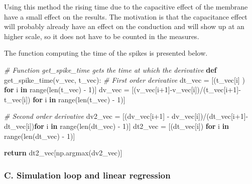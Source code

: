 \documentclass[]{article}
\newenvironment{Shaded}{}{}
\newcommand{\BuiltInTok}[1]{#1}
\newcommand{\CommentTok}[1]{\textcolor[rgb]{0.38,0.63,0.69}{\textit{#1}}}
\newcommand{\ControlFlowTok}[1]{\textcolor[rgb]{0.00,0.44,0.13}{\textbf{#1}}}
\newcommand{\DecValTok}[1]{\textcolor[rgb]{0.25,0.63,0.44}{#1}}
\newcommand{\KeywordTok}[1]{\textcolor[rgb]{0.00,0.44,0.13}{\textbf{#1}}}
\newcommand{\NormalTok}[1]{#1}
\newcommand{\OperatorTok}[1]{\textcolor[rgb]{0.40,0.40,0.40}{#1}}
\begin{document}
Using this method the rising time due to the capacitive effect of the
membrane have a small effect on the results. The motivation is that the
capacitance effect will probably already have an effect on the
conduction and will show up at an higher scale, so it does not have to
be counted in the measures.

The function computing the time of the spikes is presented below.

\begin{Shaded}
\begin{Highlighting}[]
\CommentTok{# Function get_spike_time gets the time at which the derivative  }
\KeywordTok{def}\NormalTok{ get_spike_time(v_vec, t_vec):}
    \CommentTok{# First order derivative}
\NormalTok{    dt_vec }\OperatorTok{=}\NormalTok{ [(t_vec[i] ) }\ControlFlowTok{for}\NormalTok{ i }\KeywordTok{in} \BuiltInTok{range}\NormalTok{(}\BuiltInTok{len}\NormalTok{(t_vec) }\OperatorTok{-} \DecValTok{1}\NormalTok{)]}
\NormalTok{    dv_vec }\OperatorTok{=}\NormalTok{ [(v_vec[i}\OperatorTok{+}\DecValTok{1}\NormalTok{]}\OperatorTok{-}\NormalTok{v_vec[i])}\OperatorTok{/}\NormalTok{(t_vec[i}\OperatorTok{+}\DecValTok{1}\NormalTok{]}\OperatorTok{-}\NormalTok{t_vec[i]) }\ControlFlowTok{for}\NormalTok{ i }\KeywordTok{in} \BuiltInTok{range}\NormalTok{(}\BuiltInTok{len}\NormalTok{(t_vec) }\OperatorTok{-} \DecValTok{1}\NormalTok{)]}

    \CommentTok{# Second order derivative}
\NormalTok{    dv2_vec }\OperatorTok{=}\NormalTok{ [(dv_vec[i}\OperatorTok{+}\DecValTok{1}\NormalTok{] }\OperatorTok{-}\NormalTok{ dv_vec[i])}\OperatorTok{/}\NormalTok{(dt_vec[i}\OperatorTok{+}\DecValTok{1}\NormalTok{]}\OperatorTok{-}\NormalTok{dt_vec[i])}\ControlFlowTok{for}\NormalTok{ i }\KeywordTok{in} \BuiltInTok{range}\NormalTok{(}\BuiltInTok{len}\NormalTok{(dt_vec) }\OperatorTok{-} \DecValTok{1}\NormalTok{)]}
\NormalTok{    dt2_vec }\OperatorTok{=}\NormalTok{ [(dt_vec[i]) }\ControlFlowTok{for}\NormalTok{ i }\KeywordTok{in} \BuiltInTok{range}\NormalTok{(}\BuiltInTok{len}\NormalTok{(dt_vec) }\OperatorTok{-} \DecValTok{1}\NormalTok{)]}

    \ControlFlowTok{return}\NormalTok{ dt2_vec[np.argmax(dv2_vec)]}
\end{Highlighting}
\end{Shaded}

\hypertarget{c.-simulation-loop-and-linear-regression}{%
\subsubsection{C. Simulation loop and linear
regression}\label{c.-simulation-loop-and-linear-regression}}
\end{document}
